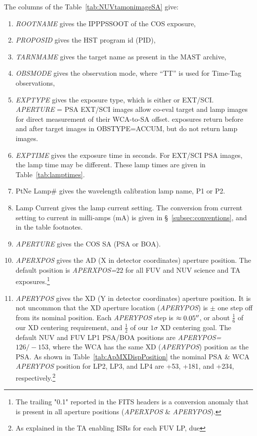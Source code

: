 The columns of the Table~\ref{tab:NUVtamonimageSA} give:
\footnotesize
\begin{enumerate}
\item \textit{ROOTNAME} gives the IPPPSSOOT of the COS exposure,
\item \textit{PROPOSID} gives the HST program id (PID),
\item \textit{TARNMAME} gives the target name as present in the MAST archive,
\item \textit{OBSMODE} gives the observation mode, where ``TT'' is used for Time-Tag observations,
\item \textit{EXPTYPE} gives the exposure type, which is either  or EXT/SCI. \textit{APERTURE} = PSA EXT/SCI images allow co-eval target and lamp images for
direct measurement of their WCA-to-SA offset.  exposures return before and after target images in \textsc{OBSTYPE}=ACCUM, but do not return lamp images.
\item \textit{EXPTIME} gives the exposure time in seconds. For EXT/SCI PSA images, the lamp time may be different. These lamp times are given in Table~\ref{tab:lamptimes}.
\item PtNe Lamp\# gives the wavelength calibration lamp name, P1 or P2.
\item Lamp Current gives the lamp current setting. The conversion from current setting to current in milli-amps (mA) is given in \S~\ref{subsec:conventions}, and in the table footnotes.
\item \textit{APERTURE} gives the COS SA (PSA or BOA).
\item \textit{APERXPOS} gives the AD (X in detector coordinates) aperture position. The default position is \textit{APERXPOS=$22$} for all FUV and NUV science and TA exposures.\footnote{The trailing "0.1" reported in the FITS headers is a conversion anomaly that is present in all aperture positions (\textit{APERXPOS} \& \textit{APERYPOS}).}
\item \textit{APERYPOS} gives the XD (Y in detector coordinates) aperture position. It is not uncommon that the XD aperture location (\textit{APERYPOS}) is $\pm$ one step off from its nominal position. Each \textit{APERYPOS} step is $\approx0.05\hbox{$^{\prime\prime}$}$, or about $\frac{1}{6}$ of
our XD centering requirement, and $\frac{1}{2}$ of our $1\sigma$ XD centering goal. The default NUV and FUV LP1 PSA/BOA positions are \textit{APERYPOS=$126/-153$}, where the WCA has the same XD (\textit{APERYPOS}) position as the PSA.
As shown in Table~\ref{tab:ApMXDispPosition} the nominal PSA \& WCA \textit{APERYPOS} position for LP2, LP3, and LP4 are +53, +181, and +234, respectively.\footnote{As explained in the TA enabling ISRs for each FUV LP, due
}
\end{enumerate}
